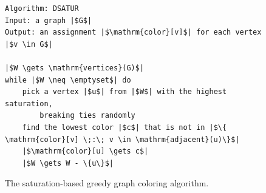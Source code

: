 \documentclass[11pt]{book}
\begin{document}
\begin{figure}[btp]
  \centering
\begin{lstlisting}[basicstyle=\rmfamily,deletekeywords={for,from,with,is,not,in,find},morekeywords={while},columns=fullflexible]
Algorithm: DSATUR
Input: a graph |$G$|
Output: an assignment |$\mathrm{color}[v]$| for each vertex |$v \in G$|

|$W \gets \mathrm{vertices}(G)$|
while |$W \neq \emptyset$| do
    pick a vertex |$u$| from |$W$| with the highest saturation,
        breaking ties randomly
    find the lowest color |$c$| that is not in |$\{ \mathrm{color}[v] \;:\; v \in \mathrm{adjacent}(u)\}$|
    |$\mathrm{color}[u] \gets c$|
    |$W \gets W - \{u\}$|
\end{lstlisting}
  \caption{The saturation-based greedy graph coloring algorithm.}
  \label{fig:satur-algo}
\end{figure}
\end{document}
